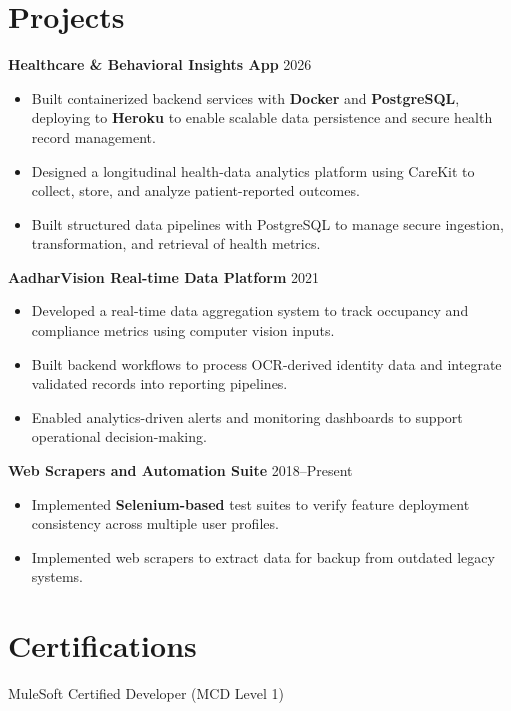\documentclass[letterpaper,11pt]{article}
\begin{document}
\section*{Projects}
\textbf{Healthcare \& Behavioral Insights App} \hfill 2026
\begin{itemize}
\item Built containerized backend services with \textbf{Docker} and \textbf{PostgreSQL}, deploying to \textbf{Heroku} to enable scalable data persistence and secure health record management.
\item Designed a longitudinal health-data analytics platform using CareKit to collect, store, and analyze patient-reported outcomes.
\item Built structured data pipelines with PostgreSQL to manage secure ingestion, transformation, and retrieval of health metrics.
\end{itemize}

\textbf{AadharVision Real-time Data Platform} \hfill 2021
\begin{itemize}
\item Developed a real-time data aggregation system to track occupancy and compliance metrics using computer vision inputs.
\item Built backend workflows to process OCR-derived identity data and integrate validated records into reporting pipelines.
\item Enabled analytics-driven alerts and monitoring dashboards to support operational decision-making.
\end{itemize}

\textbf{Web Scrapers and Automation Suite} \hfill 2018--Present
\begin{itemize}
\item Implemented \textbf{Selenium-based} test suites to verify feature deployment consistency across multiple user profiles.
\item Implemented web scrapers to extract data for backup from outdated legacy systems.
\end{itemize}


\section*{Certifications}
MuleSoft Certified Developer (MCD Level 1)
\end{document}
